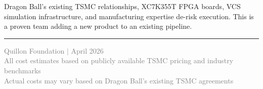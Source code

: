 \documentclass[11pt,a4paper]{article}
\begin{document}
Dragon Ball's existing TSMC relationships, XC7K355T FPGA boards, VCS simulation infrastructure, and manufacturing expertise de-risk execution. This is a proven team adding a new product to an existing pipeline.

\vspace{1cm}
\noindent\rule{\textwidth}{0.4pt}
\begin{center}
\small\textcolor{gray}{Quillon Foundation $\mid$ April 2026}\\
\small\textcolor{gray}{All cost estimates based on publicly available TSMC pricing and industry benchmarks}\\
\small\textcolor{gray}{Actual costs may vary based on Dragon Ball's existing TSMC agreements}
\end{center}
\end{document}
